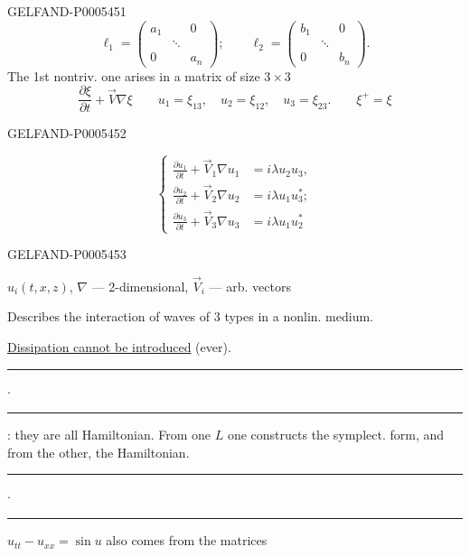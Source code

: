 \begin{GelfandAdjacentEvidence}{GELFAND-P000545}{1}
\[
\ell_1=\begin{pmatrix}a_1&&0\\&\ddots&\\0&&a_n\end{pmatrix};
\qquad
\ell_2=\begin{pmatrix}b_1&&0\\&\ddots&\\0&&b_n\end{pmatrix}.
\]
The 1st nontriv. one arises in a matrix of size \(3\times3\)
\[
\frac{\partial\xi}{\partial t}+\vec V\nabla\xi
\qquad u_1=\xi_{13},\quad u_2=\xi_{12},\quad u_3=\xi_{23}.
\qquad \xi^{+}=\xi
\]
\end{GelfandAdjacentEvidence}
\begin{GelfandAdjacentEvidence}{GELFAND-P000545}{2}

\[
\left\{\begin{aligned}
\frac{\partial u_1}{\partial t}+\vec V_1\nabla u_1&=i\lambda u_2u_3,\\
\frac{\partial u_2}{\partial t}+\vec V_2\nabla u_2&=i\lambda u_1u_3^*;\\
\frac{\partial u_3}{\partial t}+\vec V_3\nabla u_3&=i\lambda u_1u_2^*
\end{aligned}\right.
\]
\end{GelfandAdjacentEvidence}
\begin{GelfandAdjacentEvidence}{GELFAND-P000545}{3}

\(u_i(t,x,z)\), \(\nabla\) — 2-dimensional, \(\vec V_i\) — arb. vectors

Describes the interaction of waves of 3 types in a nonlin. medium.

\uline{Dissipation cannot be introduced} (ever).
\hfill\rule{1.2cm}{.35pt}\enspace\(\cdot\)\enspace\rule{1.3cm}{.35pt}\par

: they are all Hamiltonian. From one \(L\) one constructs the symplect. form, and from the other, the Hamiltonian.
\hfill\rule{1.2cm}{.35pt}\enspace\(\cdot\)\enspace\rule{1.3cm}{.35pt}\par

\(u_{tt}-u_{xx}=\sin u\) also comes from the matrices
\end{GelfandAdjacentEvidence}
